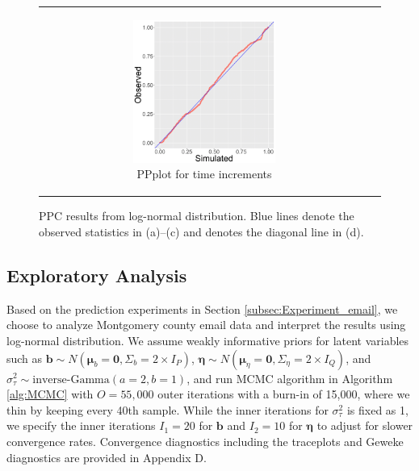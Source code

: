 \documentclass[ba]{imsart}
\numberwithin{equation}{section}
\theoremstyle{plain}
\begin{document}
\begin{figure}[!t]
\begin{tabular}[t]{cc}
\begin{subfigure}[b]{0.495\textwidth}
			   	\end{subfigure}
			   	\begin{subfigure}[b]{0.495\textwidth}
			   				\centering
			   		\caption{PPplot for time increments}
			   		\includegraphics[width=0.56\textwidth]{img/timePPplot-1.png}	
			   	\end{subfigure}
		\end{tabular}
		\caption {PPC results from log-normal distribution. Blue lines denote the observed statistics in (a)--(c) and denotes the diagonal line in (d).}
		\label{figure:PPCresults}
	\end{figure}
	
	\subsection{Exploratory Analysis}\label{subsec:Result_email}
	Based on the prediction experiments in Section \ref{subsec:Experiment_email}, we choose to analyze Montgomery county email data and interpret the results using log-normal distribution. We assume weakly informative priors for latent variables such as $\boldsymbol{b}\sim N(\boldsymbol{\mu}_b=\boldsymbol{0}, \Sigma_b = 2\times I_P)$, $\boldsymbol{\eta}\sim N(\boldsymbol{\mu}_\eta=\boldsymbol{0}, \Sigma_\eta = 2\times I_Q)$, and $\sigma_\tau^2 \sim \mbox{inverse-Gamma}(a=2, b=1)$, and run MCMC algorithm in Algorithm \ref{alg:MCMC} with $O=55,000$ outer iterations with a burn-in of 15,000, where we thin by keeping every 40th sample. While the inner iterations for $\sigma_\tau^2$ is fixed as 1, we specify the inner iterations $I_1=20$ for $\boldsymbol{b}$ and $I_2=10$ for $\boldsymbol{\eta}$ to adjust for slower convergence rates. Convergence diagnostics including the traceplots and Geweke diagnostics \citep{geweke1991evaluating} are provided in Appendix D.
\end{document}
